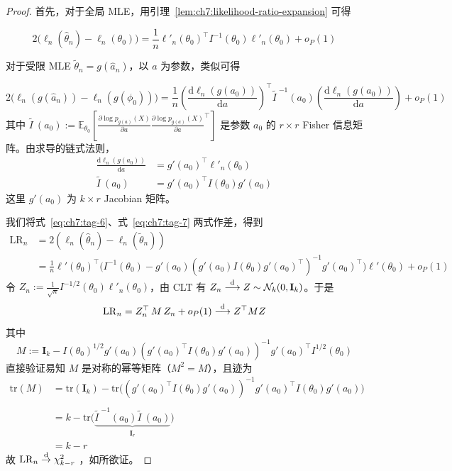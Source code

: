 \begin{proof}

首先，对于全局 MLE，用引理~\ref{lem:ch7:likelihood-ratio-expansion} 可得

\begin{equation}
\label{eq:ch7:tag-6}
2 \big( \ell_n(\widehat{\theta}_n) - \ell_n(\theta_0) \big) = \frac{1}{n} \ell'_n(\theta_0)^\top I^{-1}(\theta_0) \ell'_n(\theta_0)  + o_P(1)
\end{equation}

对于受限 MLE $\widetilde{\theta}_n = g(\widehat a_n)$，以 $a$ 为参数，类似可得

\begin{equation}
\label{eq:ch7:tag-7}
2 \big( \ell_n(g(\widehat a_n)) - \ell_n(g(\phi_0)) \big) = \frac{1}{n} \left( \frac{\mathrm{d} \ell_n(g(a_0))}{\mathrm{d} a} \right)^\top \widetilde{I\ }^{-1}\!(a_0) \left( \frac{\mathrm{d} \ell_n(g(a_0))}{\mathrm{d}a} \right) + o_P(1)
\end{equation}
其中 $\widetilde{I\ }\!(a_0) := \mathbb{E}_{\theta_0}\left[ \frac{\partial \log p_{g(a)}(X)}{\partial a} \frac{\partial \log p_{g(a)}(X)}{\partial a}^\top \right]$ 是参数 $a_0$ 的 $r\times r$ Fisher 信息矩阵。由求导的链式法则，
\[\begin{aligned}\frac{\mathrm{d}\ell_n(g(a_0))}{\mathrm{d} a} &= g'(a_0)^\top \ell'_n(\theta_0)\\ \widetilde{I\ }\!(a_0) &= g'(a_0)^\top  I(\theta_0)g'(a_0)\end{aligned}\]
这里 $g'(a_0)$ 为 $k \times r$ Jacobian 矩阵。

我们将式~\eqref{eq:ch7:tag-6}、式~\eqref{eq:ch7:tag-7} 两式作差，得到
\[\begin{aligned} \mathrm{LR}_n &= 2 (\ell_n(\widehat{\theta}_n) - \ell_n(\widetilde{\theta}_n)) \\ &= \frac{1}{n} \ell'(\theta_0)^\top \big( I^{-1}(\theta_0) - g'(a_0)(g'(a_0) I(\theta_0) g'(a_0)^\top)^{-1} g'(a_0) ^\top \big) \ell'(\theta_0)+ o_P(1) \end{aligned}\]
令 $Z_n := \frac{1}{\sqrt{n}} I^{-1/2}(\theta_0) \ell'_n(\theta_0)$，由 CLT 有 $Z_n \overset{\rm d}\longrightarrow Z \sim \mathcal{N}_k(0,\mathbf I_k)$。于是
\[\mathrm{LR}_n = Z_n^\top \, M \, Z_n + o_P(1) \overset{\rm d}\longrightarrow Z^\top M Z\]
其中 \[ M := \mathbf I_k - I(\theta_0)^{1/2} g'(a_0) (g'(a_0)^\top I(\theta_0) g'(a_0))^{-1} g'(a_0)^\top I^{1/2}(\theta_0) \]直接验证易知 $M$ 是对称的幂等矩阵（$M^2 = M$），且迹为
\[\begin{aligned} \mathrm{tr}(M) &=\mathrm{tr}(\mathbf I_k) - \mathrm{tr}\big( (g'(a_0)^\top I(\theta_0) g'(a_0))^{-1} g'(a_0)^\top I(\theta_0) g'(a_0)\big)\\ \\ &=k-\mathrm{tr}\Big(\underbrace{\widetilde{I\ }^{-1}\!(a_0)\widetilde{I\ }\!(a_0)}_{\mathbf I_r}  \Big)\\ &=k-r \end{aligned}\]
故 $\mathrm{LR}_n\overset{\rm d}\to\chi^2_{k-r}$ ，如所欲证。

\end{proof}

